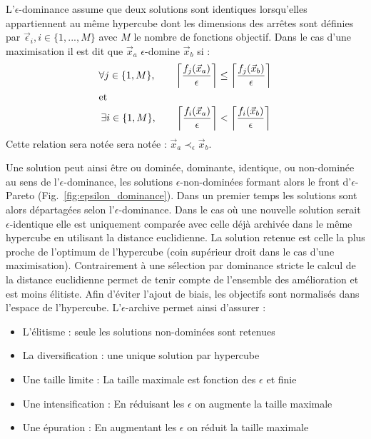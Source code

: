 \begin{Def}\label{def:eps_dominance}
L’$\epsilon$-dominance assume que deux solutions sont identiques lorsqu’elles appartiennent
au même hypercube dont les dimensions des arrêtes sont définies par $\vec{\epsilon}_{i}, i \in \{1, ..., M\}$ avec $M$ le nombre
de fonctions objectif.
Dans le cas d’une maximisation il est dit que $\vec{x}_{a}$ $\epsilon$-domine $\vec{x}_{b}$ si :
\begin{align*}
  \forall j \in \{1, M\}, \qquad \left\lceil\frac{f_{j}(\vec{x}_{a})}{\epsilon}\right\rceil &\leq \left\lceil\frac{f_{j}(\vec{x}_{b})}{\epsilon}\right\rceil  \\
  \intertext{et}
  \exists i \in \{1, M\}, \qquad \left\lceil\frac{f_{i}(\vec{x}_{a})}{\epsilon}\right\rceil &< \left\lceil\frac{f_{i}(\vec{x}_{b})}{\epsilon}\right\rceil  \\
\end{align*}
Cette relation sera notée sera notée : $\vec{x}_{a} \prec_{\epsilon} \vec{x}_{b}$.
\end{Def}

Une solution peut ainsi être ou dominée, dominante, identique, ou non-dominée au
sens de l’$\epsilon$-dominance, les solutions $\epsilon$-non-dominées formant alors
le front d’$\epsilon$-Pareto (Fig.~\ref{fig:epsilon_dominance}).
Dans un premier temps les solutions sont alors départagées selon l’$\epsilon$-dominance.
Dans le cas où une nouvelle solution serait $\epsilon$-identique elle est uniquement
comparée avec celle déjà archivée dans le même hypercube en utilisant la distance euclidienne.
La solution retenue est celle la plus proche de l’optimum de l’hypercube (coin supérieur
droit dans le cas d’une maximisation).
Contrairement à une sélection par dominance stricte le
calcul de la distance euclidienne permet de tenir compte de l’ensemble des amélioration
et est moins élitiste. Afin d’éviter l’ajout de biais, les objectifs sont normalisés
dans l’espace de l’hypercube.
L’$\epsilon$-archive permet ainsi d’assurer :
\begin{itemize}
  \item L’élitisme : seule les solutions non-dominées sont retenues
  \item La diversification : une unique solution par hypercube
  \item Une taille limite : La taille maximale est fonction des $\epsilon$ et finie
  \item Une intensification : En réduisant les $\epsilon$ on augmente la taille maximale
  \item Une épuration : En augmentant les $\epsilon$ on réduit la taille maximale
\end{itemize}

